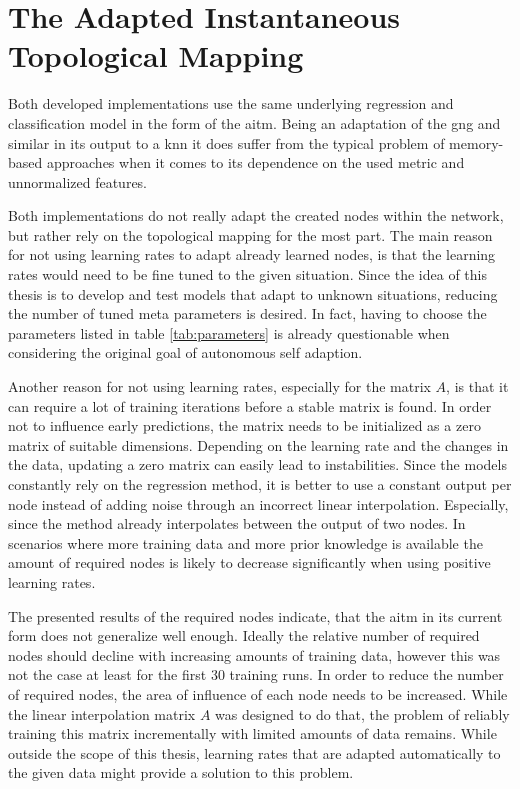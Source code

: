 \section{The Adapted Instantaneous Topological Mapping \label{sec:discAITM}} 

Both developed implementations use the same underlying regression and classification model in the form of the \gls{aitm}. Being an adaptation of the \gls{gng} and similar in its output to a \gls{knn} it does suffer from the typical problem of memory-based approaches when it comes to its dependence on the used metric and unnormalized features.

Both implementations do not really adapt the created nodes within the network, but rather rely on the topological mapping for the most part. The main reason for not using learning rates to adapt already learned nodes, is that the learning rates would need to be fine tuned to the given situation. Since the idea of this thesis is to develop and test models that adapt to unknown situations, reducing the number of tuned meta parameters is desired. In fact, having to choose the parameters listed in table \ref{tab:parameters} is already questionable when considering the original goal of autonomous self adaption.

Another reason for not using learning rates, especially for the matrix $A$, is that it can require a lot of training iterations before a stable matrix is found. In order not to influence early predictions, the matrix needs to be initialized as a zero matrix of suitable dimensions. Depending on the learning rate and the changes in the data, updating a zero matrix can easily lead to instabilities.
Since the models constantly rely on the regression method, it is better to use a constant output per node instead of adding noise through an incorrect linear interpolation. Especially, since the method already interpolates between the output of two nodes.
In scenarios where more training data and more prior knowledge is available the amount of required nodes is likely to decrease significantly when using positive learning rates.

The presented results of the required nodes indicate, that the \gls{aitm} in its current form does not generalize well enough. Ideally the relative number of required nodes should decline with increasing amounts of training data, however this was not the case at least for the first 30 training runs. In order to reduce the number of required nodes, the area of influence of each node needs to be increased. While the linear interpolation matrix $A$ was designed to do that, the problem of reliably training this matrix incrementally with limited amounts of data remains. While outside the scope of this thesis, learning rates that are adapted automatically to the given data might provide a solution to this problem.

